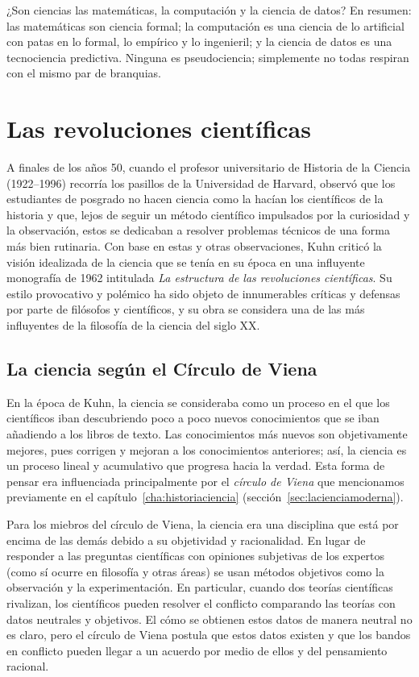 \begin{digress}{¿Son ciencias las matemáticas, la computación y la ciencia de datos?}
	En resumen: las matemáticas son ciencia formal; la computación es una ciencia de lo artificial con patas en lo formal, lo empírico y lo ingenieril; y la ciencia de datos es una tecnociencia predictiva.
	Ninguna es pseudociencia; simplemente no todas respiran con el mismo par de branquias.
\end{digress}

\section{Las revoluciones científicas}
\label{sec:lasrevolucionescientificas}
A finales de los años 50, cuando el profesor universitario de Historia de la Ciencia  (1922--1996) recorría los pasillos de la Universidad de Harvard, observó que los estudiantes de posgrado no hacen ciencia como la hacían los científicos de la historia y que, lejos de seguir un método científico impulsados por la curiosidad y la observación, estos se dedicaban a resolver problemas técnicos de una forma más bien rutinaria.
Con base en estas y otras observaciones, Kuhn criticó la visión idealizada de la ciencia que se tenía en su época en una influyente monografía de 1962 intitulada \emph{La estructura de las revoluciones científicas}\cite{Kuhn2005}.
Su estilo provocativo y polémico ha sido objeto de innumerables críticas y defensas por parte de filósofos y científicos, y su obra se considera una de las más influyentes de la filosofía de la ciencia del siglo XX.

\subsection*{La ciencia según el Círculo de Viena}
\label{sub:circulodeviena}
En la época de Kuhn, la ciencia se consideraba como un proceso en el que los científicos iban descubriendo poco a poco nuevos conocimientos que se iban añadiendo a los libros de texto.
Las conocimientos más nuevos son objetivamente mejores, pues corrigen y mejoran a los conocimientos anteriores; así, la ciencia es un proceso lineal y acumulativo que progresa hacia la verdad.
Esta forma de pensar era influenciada principalmente por el \emph{círculo de Viena} que mencionamos previamente en el capítulo~\ref{cha:historiaciencia} (sección~\ref{sec:lacienciamoderna}).

Para los miebros del círculo de Viena, la ciencia era una disciplina que está por encima de las demás debido a su objetividad y racionalidad.
En lugar de responder a las preguntas científicas con opiniones subjetivas de los expertos (como sí ocurre en filosofía y otras áreas) se usan métodos objetivos como la observación y la experimentación.
En particular, cuando dos teorías científicas rivalizan, los científicos pueden resolver el conflicto comparando las teorías con datos neutrales y objetivos.
El cómo se obtienen estos datos de manera neutral no es claro, pero el círculo de Viena postula que estos datos existen y que los bandos en conflicto pueden llegar a un acuerdo por medio de ellos y del pensamiento racional.

